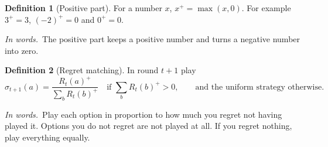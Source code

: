 \documentclass[11pt]{article}
\theoremstyle{definition}
\newtheorem{definition}{Definition}[section]
\newcommand{\inwords}{\par\smallskip\noindent\textit{In words.}\ }
\begin{document}
\begin{definition}[Positive part]\label{def:pos}
For a number $x$, $x^+=\max(x,0)$. For example $3^+=3$, $(-2)^+=0$ and $0^+=0$.
\inwords The positive part keeps a positive number and turns a negative number into zero.
\end{definition}

\begin{definition}[Regret matching]\label{def:rm}
In round $t+1$ play
\[ \sigma_{t+1}(a)=\frac{R_t(a)^+}{\sum_bR_t(b)^+}\quad\text{if }\sum_bR_t(b)^+>0,\qquad\text{and the uniform strategy otherwise.} \]
\inwords Play each option in proportion to how much you regret not having played it. Options you do not regret are not
played at all. If you regret nothing, play everything equally.
\end{definition}
\end{document}
